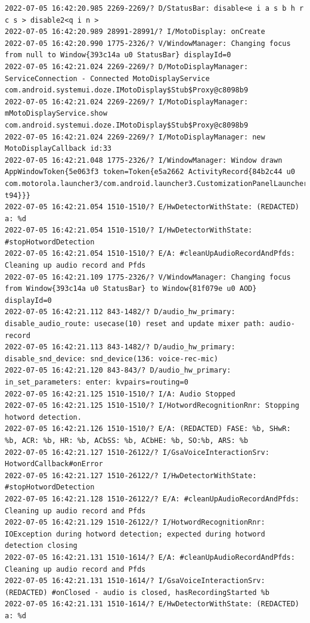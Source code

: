 \documentclass[a4paper,12pt]{book}
\begin{document}
\begin{lstlisting}
2022-07-05 16:42:20.985 2269-2269/? D/StatusBar: disable<e i a s b h r c s > disable2<q i n >
2022-07-05 16:42:20.989 28991-28991/? I/MotoDisplay: onCreate
2022-07-05 16:42:20.990 1775-2326/? V/WindowManager: Changing focus from null to Window{393c14a u0 StatusBar} displayId=0
2022-07-05 16:42:21.024 2269-2269/? D/MotoDisplayManager: ServiceConnection - Connected MotoDisplayService com.android.systemui.doze.IMotoDisplay$Stub$Proxy@c8098b9
2022-07-05 16:42:21.024 2269-2269/? I/MotoDisplayManager: mMotoDisplayService.show com.android.systemui.doze.IMotoDisplay$Stub$Proxy@c8098b9
2022-07-05 16:42:21.024 2269-2269/? I/MotoDisplayManager: new MotoDisplayCallback id:33
2022-07-05 16:42:21.048 1775-2326/? I/WindowManager: Window drawn AppWindowToken{5e063f3 token=Token{e5a2662 ActivityRecord{84b2c44 u0 com.motorola.launcher3/com.android.launcher3.CustomizationPanelLauncher t94}}}
2022-07-05 16:42:21.054 1510-1510/? E/HwDetectorWithState: (REDACTED) a: %d
2022-07-05 16:42:21.054 1510-1510/? I/HwDetectorWithState: #stopHotwordDetection
2022-07-05 16:42:21.054 1510-1510/? E/A: #cleanUpAudioRecordAndPfds: Cleaning up audio record and Pfds
2022-07-05 16:42:21.109 1775-2326/? V/WindowManager: Changing focus from Window{393c14a u0 StatusBar} to Window{81f079e u0 AOD} displayId=0
2022-07-05 16:42:21.112 843-1482/? D/audio_hw_primary: disable_audio_route: usecase(10) reset and update mixer path: audio-record
2022-07-05 16:42:21.113 843-1482/? D/audio_hw_primary: disable_snd_device: snd_device(136: voice-rec-mic)
2022-07-05 16:42:21.120 843-843/? D/audio_hw_primary: in_set_parameters: enter: kvpairs=routing=0
2022-07-05 16:42:21.125 1510-1510/? I/A: Audio Stopped
2022-07-05 16:42:21.125 1510-1510/? I/HotwordRecognitionRnr: Stopping hotword detection.
2022-07-05 16:42:21.126 1510-1510/? E/A: (REDACTED) FASE: %b, SHwR: %b, ACR: %b, HR: %b, ACbSS: %b, ACbHE: %b, SO:%b, ARS: %b
2022-07-05 16:42:21.127 1510-26122/? I/GsaVoiceInteractionSrv: HotwordCallback#onError
2022-07-05 16:42:21.127 1510-26122/? I/HwDetectorWithState: #stopHotwordDetection
2022-07-05 16:42:21.128 1510-26122/? E/A: #cleanUpAudioRecordAndPfds: Cleaning up audio record and Pfds
2022-07-05 16:42:21.129 1510-26122/? I/HotwordRecognitionRnr: IOException during hotword detection; expected during hotword detection closing
2022-07-05 16:42:21.131 1510-1614/? E/A: #cleanUpAudioRecordAndPfds: Cleaning up audio record and Pfds
2022-07-05 16:42:21.131 1510-1614/? I/GsaVoiceInteractionSrv: (REDACTED) #onClosed - audio is closed, hasRecordingStarted %b
2022-07-05 16:42:21.131 1510-1614/? E/HwDetectorWithState: (REDACTED) a: %d

\end{lstlisting}
\end{document}

